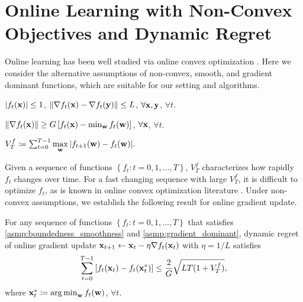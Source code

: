 \section{Online Learning with Non-Convex Objectives and Dynamic Regret}
\label{sec:online_learning}

Online learning has been well studied via online convex optimization \citep{shalev2012online}. Here we consider the alternative assumptions of non-convex, smooth, and gradient dominant functions, which are suitable for our setting and algorithms.

\begin{asmp}
\label{asmp:boundedness_smoothness}
$\left| f_t({\mathbf{x}}) \right| \le 1$, $\left\| \nabla f_t({\mathbf{x}} ) - \nabla f_t({\mathbf{y}}) \right\| \le L $, $\forall {\mathbf{x}}, {\mathbf{y}}$, $\forall t$.
\end{asmp}

\begin{asmp}
\label{asmp:gradient_dominant}
$\left\| \nabla f_t({\mathbf{x}}) \right\| \ge G \left[ f_t({\mathbf{x}}) - \min_{{\mathbf{w}}}{ f_t({\mathbf{w}} )} \right]$, $\forall {\mathbf{x}}$, $\forall t$.
\end{asmp}

\begin{defi}
\label{defi:function_variation}
$V_{T}^{f} \coloneqq \sum_{t=0}^{T-1}{\max\limits_{{\mathbf{w}}}{\left| f_{t+1}({\mathbf{w}}) - f_{t}({\mathbf{w}}) \right| } }.$
\end{defi}

Given a sequence of functions $\left\{ f_t : t = 0, 1, \dots, T \right\}$, $V_{T}^{f} $ characterizes how rapidly $f_t$ changes over time. For a fast changing sequence with large $V_{T}^{f} $, it is difficult to optimize $f_t$, as is known in online convex optimization literature \citep{jadbabaie2015online}. Under non-convex assumptions, we establish the following result for online gradient update.

\begin{thm}
\label{thm:online_learning_regret}
For any sequence of functions $\left\{ f_t : t = 0, 1, \dots, T \right\}$ that satisfies \cref{asmp:boundedness_smoothness} and \cref{asmp:gradient_dominant}, dynamic regret of online gradient update ${\mathbf{x}}_{t+1} \gets {\mathbf{x}}_{t} - \eta \nabla f_{t}({\mathbf{x}}_{t})$ with $\eta = 1/L$ satisfies
\begin{equation}
\label{eq:online_learning_regret}
\begin{split}
    \sum\limits_{t=0}^{T-1}{\left[ f_t({\mathbf{x}}_t) - f_t( {\mathbf{x}}_t^*) \right]} \le \frac{2}{G} \sqrt{L T ( 1 + V_T^f )},
\end{split}
\end{equation}
where ${\mathbf{x}}_t^* \coloneqq \operatorname*{arg\,min}_{{\mathbf{w}}}{f_t({\mathbf{w}})}$, $\forall t$.
\end{thm}

